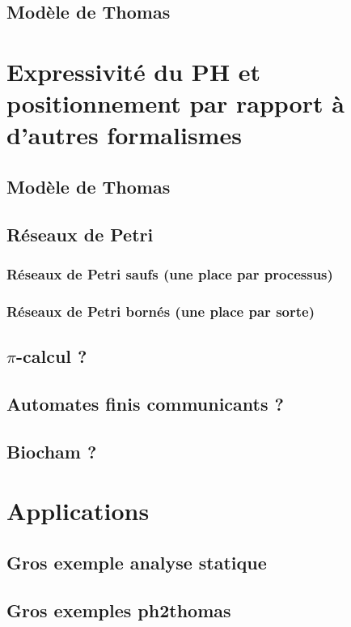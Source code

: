 \documentclass[12pt, french]{these-LUNAM}  %
\theoremstyle{definition}
\theoremstyle{remark}
\begin{document}
  \section{Modèle de Thomas}
  





\chapter{Expressivité du PH et positionnement par rapport à d'autres formalismes}
  \section{Modèle de Thomas}
  \section{Réseaux de Petri}
    \subsection{Réseaux de Petri saufs (une place par processus)}
    \subsection{Réseaux de Petri bornés (une place par sorte)}
  \section{$\pi$-calcul ?}
  \section{Automates finis communicants ?}
  \section{Biocham ?}

\chapter{Applications}
  \section{Gros exemple analyse statique}
  \section{Gros exemples ph2thomas}


  
%

\end{document}
